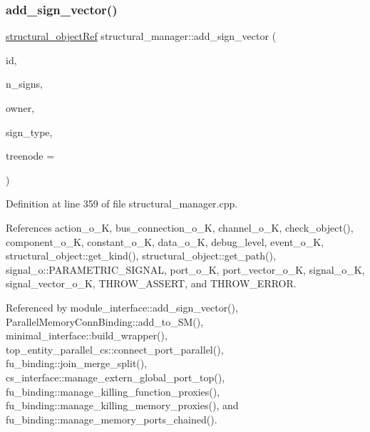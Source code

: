 \subsubsection{\texorpdfstring{add\+\_\+sign\+\_\+vector()}{add\_sign\_vector()}}
{\footnotesize\ttfamily \hyperlink{structural__objects_8hpp_a8ea5f8cc50ab8f4c31e2751074ff60b2}{structural\+\_\+object\+Ref} structural\+\_\+manager\+::add\+\_\+sign\+\_\+vector (\begin{DoxyParamCaption}\item[{std\+::string}]{id,  }\item[{unsigned int}]{n\+\_\+signs,  }\item[{\hyperlink{structural__objects_8hpp_a8ea5f8cc50ab8f4c31e2751074ff60b2}{structural\+\_\+object\+Ref}}]{owner,  }\item[{\hyperlink{structural__objects_8hpp_a219296792577e3292783725961506c83}{structural\+\_\+type\+\_\+descriptor\+Ref}}]{sign\+\_\+type,  }\item[{unsigned int}]{treenode = {} }\end{DoxyParamCaption})}



Definition at line 359 of file structural\+\_\+manager.\+cpp.



References action\+\_\+o\+\_\+K, bus\+\_\+connection\+\_\+o\+\_\+K, channel\+\_\+o\+\_\+K, check\+\_\+object(), component\+\_\+o\+\_\+K, constant\+\_\+o\+\_\+K, data\+\_\+o\+\_\+K, debug\+\_\+level, event\+\_\+o\+\_\+K, structural\+\_\+object\+::get\+\_\+kind(), structural\+\_\+object\+::get\+\_\+path(), signal\+\_\+o\+::\+P\+A\+R\+A\+M\+E\+T\+R\+I\+C\+\_\+\+S\+I\+G\+N\+AL, port\+\_\+o\+\_\+K, port\+\_\+vector\+\_\+o\+\_\+K, signal\+\_\+o\+\_\+K, signal\+\_\+vector\+\_\+o\+\_\+K, T\+H\+R\+O\+W\+\_\+\+A\+S\+S\+E\+RT, and T\+H\+R\+O\+W\+\_\+\+E\+R\+R\+OR.



Referenced by module\+\_\+interface\+::add\+\_\+sign\+\_\+vector(), Parallel\+Memory\+Conn\+Binding\+::add\+\_\+to\+\_\+\+S\+M(), minimal\+\_\+interface\+::build\+\_\+wrapper(), top\+\_\+entity\+\_\+parallel\+\_\+cs\+::connect\+\_\+port\+\_\+parallel(), fu\+\_\+binding\+::join\+\_\+merge\+\_\+split(), cs\+\_\+interface\+::manage\+\_\+extern\+\_\+global\+\_\+port\+\_\+top(), fu\+\_\+binding\+::manage\+\_\+killing\+\_\+function\+\_\+proxies(), fu\+\_\+binding\+::manage\+\_\+killing\+\_\+memory\+\_\+proxies(), and fu\+\_\+binding\+::manage\+\_\+memory\+\_\+ports\+\_\+chained().

